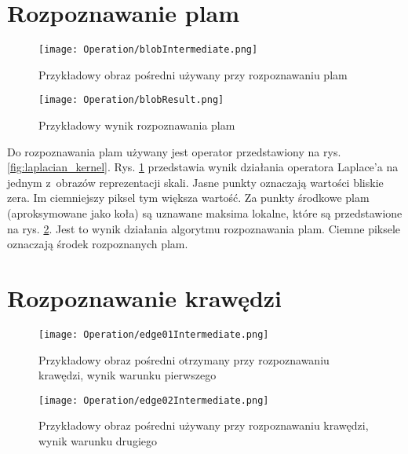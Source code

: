 \section{Rozpoznawanie plam}
\label{sec:dzialanieBlob}

\begin{figure}[h]
\begin{center}
\texttt{[image: Operation/blobIntermediate.png]}
\end{center}
\caption{Przykładowy obraz pośredni używany przy rozpoznawaniu plam}
\label{fig:blobIntermediate}
\end{figure}

\begin{figure}[h]
\begin{center}
\texttt{[image: Operation/blobResult.png]}
\end{center}
\caption{Przykładowy wynik rozpoznawania plam}
\label{fig:blobResult}
\end{figure}

Do rozpoznawania plam używany jest operator przedstawiony na rys. \ref{fig:laplacian_kernel}. Rys. \ref{fig:blobIntermediate} przedstawia wynik działania operatora Laplace'a na jednym z~obrazów reprezentacji skali. Jasne punkty oznaczają wartości bliskie zera. Im ciemniejszy piksel tym większa wartość. Za punkty środkowe plam (aproksymowane jako koła) są uznawane maksima lokalne, które są przedstawione na rys. \ref{fig:blobResult}. Jest to wynik działania algorytmu rozpoznawania plam. Ciemne piksele oznaczają środek rozpoznanych plam.

\section{Rozpoznawanie krawędzi}
\label{sec:dzialanieEdge}

\begin{figure}[h]
\begin{center}
\texttt{[image: Operation/edge01Intermediate.png]}
\end{center}
\caption{Przykładowy obraz pośredni otrzymany przy rozpoznawaniu krawędzi, wynik warunku pierwszego}
\label{fig:edgeIntermediate1}
\end{figure}


\begin{figure}[h]
\begin{center}
\texttt{[image: Operation/edge02Intermediate.png]}
\end{center}
\caption{Przykładowy obraz pośredni używany przy rozpoznawaniu krawędzi, wynik warunku drugiego}
\label{fig:edgeIntermediate2}
\end{figure}

